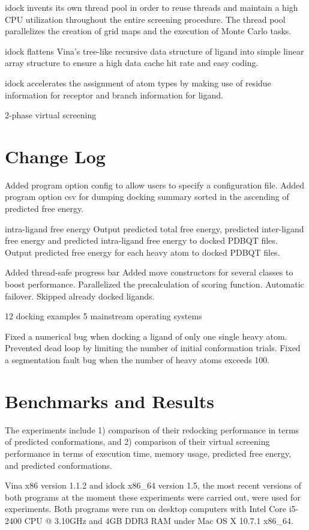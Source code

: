 \documentclass[10pt,conference,compsocconf]{../IEEEtran}
\begin{document}
idock invents its own thread pool in order to reuse threads and maintain a high CPU utilization throughout the entire screening procedure. The thread pool parallelizes the creation of grid maps and the execution of Monte Carlo tasks.

idock flattens Vina's tree-like recursive data structure of ligand into simple linear array structure to ensure a high data cache hit rate and easy coding.

idock accelerates the assignment of atom types by making use of residue information for receptor and branch information for ligand.

2-phase virtual screening

\section{Change Log}

Added program option config to allow users to specify a configuration file.
Added program option csv for dumping docking summary sorted in the ascending of predicted free energy.

intra-ligand free energy
Output predicted total free energy, predicted inter-ligand free energy and predicted intra-ligand free energy to docked PDBQT files. Output predicted free energy for each heavy atom to docked PDBQT files.

Added thread-safe progress bar
Added move constructors for several classes to boost performance.
Parallelized the precalculation of scoring function.
Automatic failover. Skipped already docked ligands.

12 docking examples
5 mainstream operating systems

Fixed a numerical bug when docking a ligand of only one single heavy atom.
Prevented dead loop by limiting the number of initial conformation trials.
Fixed a segmentation fault bug when the number of heavy atoms exceeds 100.

\section{Benchmarks and Results}

The experiments include 1) comparison of their redocking performance in terms of predicted conformations, and 2) comparison of their virtual screening performance in terms of execution time, memory usage, predicted free energy, and predicted conformations.

Vina x86 version 1.1.2 and idock x86\_64 version 1.5, the most recent versions of both programs at the moment these experiments were carried out, were used for experiments. Both programs were run on desktop computers with Intel Core i5-2400 CPU @ 3.10GHz and 4GB DDR3 RAM under Mac OS X 10.7.1 x86\_64.
\end{document}
